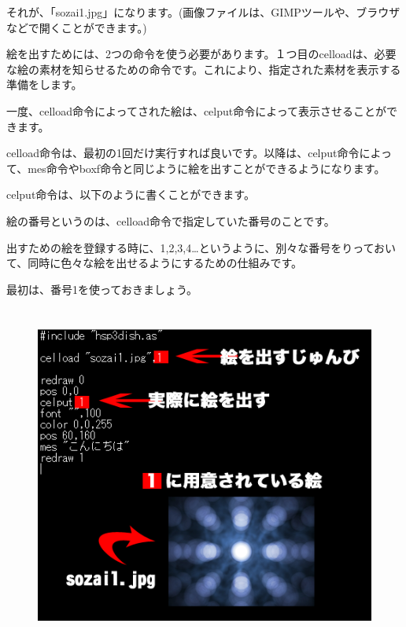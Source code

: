 それが、「sozai1.jpg」になります。(画像ファイルは、GIMPツールや、ブラウザなどで開くことができます。)


絵を出すためには、2つの命令を使う必要があります。１つ目のcelloadは、必要な絵の素材を知らせるための命令です。これにより、指定された素材を表示する準備をします。

\begin{description}
    \item {}
\end{description}


一度、celload命令によってされた絵は、celput命令によって表示させることができます。

celload命令は、最初の1回だけ実行すれば良いです。以降は、celput命令によって、mes命令やboxf命令と同じように絵を出すことができるようになります。


celput命令は、以下のように書くことができます。




\begin{description}
    \item {}
\end{description}



絵の番号というのは、celload命令で指定していた番号のことです。

出すための絵を登録する時に、1,2,3,4…というように、別々な番号をりっておいて、同時に色々な絵を出せるようにするための仕組みです。

最初は、番号1を使っておきましょう。


\begin{figure}[H]
    \begin{center}
      \includegraphics[keepaspectratio,width=12.806cm,height=11.206cm]{text04-img/s_celload.png}
    \end{center}
    \label{fig:prog_menu}
\end{figure}


